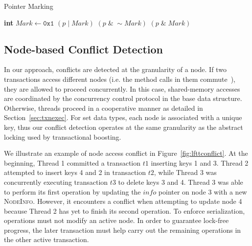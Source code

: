 \documentclass[]{sig-alternate-05-2015}
\begin{document}
\vspace{-0.2in}
\begin{algorithm}[h]
    \caption{Pointer Marking}
    \label{alg:pointermarking}
    \begin{algorithmic}[1]
        \State \textbf{int} $Mark \gets \texttt{0x1}$
         $(p\;|\;Mark)$
        \EndDefine
         $(p\;\&\;\sim Mark)$
        \EndDefine
         $(p\;\&\;Mark)$
        \EndDefine
    \end{algorithmic}
\end{algorithm}
\vspace{-0.2in}


\subsection{Node-based Conflict Detection}
In our approach, conflicts are detected at the granularity of a node. 
If two transactions access different nodes (i.e. the method calls in them commute~\cite{herlihy2008transactional}), they are allowed to proceed concurrently. 
In this case, shared-memory accesses are coordinated by the concurrency control protocol in the base data structure.
Otherwise, threads proceed in a cooperative manner as detailed in Section~\ref{sec:txnexec}.
For set data types, each node is associated with a unique key, thus our conflict detection operates at the same granularity as the abstract locking used by transactional boosting.

We illustrate an example of node access conflict in Figure~\ref{fig:lfttconflict}.
At the beginning, Thread 1 committed a transaction $t1$ inserting keys 1 and 3. 
Thread 2 attempted to insert keys 4 and 2 in transaction $t2$, while Thread 3 was concurrently executing transaction $t3$ to delete keys 3 and 4.
Thread 3 was able to perform its first operation by updating the $info$ pointer on node 3 with a new \textsc{NodeInfo}.
However, it encounters a conflict when attempting to update node 4 because Thread 2 has yet to finish its second operation.
To enforce serialization, operations must not modify an active node. 
In order to guarantee lock-free progress, the later transaction must help carry out the remaining operations in the other active transaction.
\end{document}
